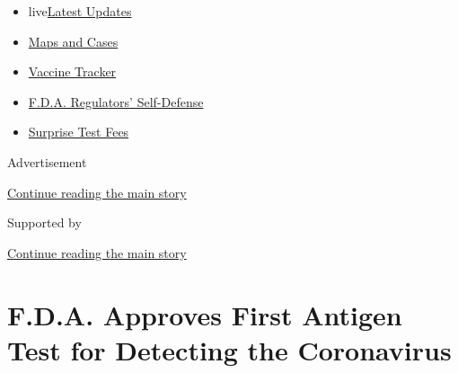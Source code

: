 \begin{itemize}
\tightlist
\item
  live\href{https://www.nytimes3xbfgragh.onion/2020/09/11/world/covid-19-coronavirus.html?name=styln-coronavirus-national\&region=TOP_BANNER\&block=storyline_menu_recirc\&action=click\&pgtype=Article\&impression_id=7d7b0c31-f4b7-11ea-9a51-c71a1ff23523\&variant=undefined}{Latest
  Updates}
\item
  \href{https://www.nytimes3xbfgragh.onion/interactive/2020/us/coronavirus-us-cases.html?name=styln-coronavirus-national\&region=TOP_BANNER\&block=storyline_menu_recirc\&action=click\&pgtype=Article\&impression_id=7d7b3340-f4b7-11ea-9a51-c71a1ff23523\&variant=undefined}{Maps
  and Cases}
\item
  \href{https://www.nytimes3xbfgragh.onion/interactive/2020/science/coronavirus-vaccine-tracker.html?name=styln-coronavirus-national\&region=TOP_BANNER\&block=storyline_menu_recirc\&action=click\&pgtype=Article\&impression_id=7d7b3341-f4b7-11ea-9a51-c71a1ff23523\&variant=undefined}{Vaccine
  Tracker}
\item
  \href{https://www.nytimes3xbfgragh.onion/2020/09/10/us/politics/fda-coronavirus-vaccine.html?name=styln-coronavirus-national\&region=TOP_BANNER\&block=storyline_menu_recirc\&action=click\&pgtype=Article\&impression_id=7d7b3342-f4b7-11ea-9a51-c71a1ff23523\&variant=undefined}{F.D.A.
  Regulators' Self-Defense}
\item
  \href{https://www.nytimes3xbfgragh.onion/2020/09/09/upshot/coronavirus-surprise-test-fees.html?name=styln-coronavirus-national\&region=TOP_BANNER\&block=storyline_menu_recirc\&action=click\&pgtype=Article\&impression_id=7d7b3343-f4b7-11ea-9a51-c71a1ff23523\&variant=undefined}{Surprise
  Test Fees}
\end{itemize}

Advertisement

\protect\hyperlink{after-top}{Continue reading the main story}

Supported by

\protect\hyperlink{after-sponsor}{Continue reading the main story}

\hypertarget{fda-approves-first-antigen-test-for-detecting-the-coronavirus}{%
\section{F.D.A. Approves First Antigen Test for Detecting the
Coronavirus}\label{fda-approves-first-antigen-test-for-detecting-the-coronavirus}}

